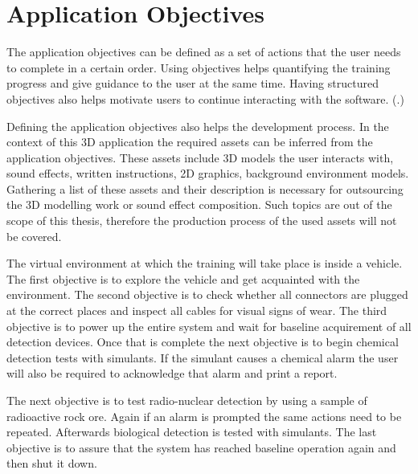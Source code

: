 \documentclass[12pt, a4paper,oneside, nocenter]{thesis}
\renewcommand{\citep}[1]{(\citealp{#1}.)}
\begin{document}
\section{Application Objectives}
The application objectives can be defined as a set of actions that the user needs to complete in a certain order. Using objectives helps quantifying the training progress and give guidance to the user at the same time. Having structured objectives also helps motivate users to continue interacting with the software. \citep{goal-oriented-games}
\par
Defining the application objectives also helps the development process. In the context of this 3D application the required assets can be inferred from the application objectives. These assets include 3D models the user interacts with, sound effects, written instructions, 2D graphics, background environment models. Gathering a list of these assets and their description is necessary for outsourcing the 3D modelling work or sound effect composition. Such topics are out of the scope of this thesis, therefore the production process of the used assets will not be covered.
\par
The virtual environment at which the training will take place is inside a vehicle. The first objective is to explore the vehicle and get acquainted with the environment. The second objective is to check whether all connectors are plugged at the correct places and inspect all cables for visual signs of wear. The third objective is to power up the entire system and wait for baseline acquirement of all detection devices. Once that is complete the next objective is to begin chemical detection tests with simulants. If the simulant causes a chemical alarm the user will also be required to acknowledge that alarm and print a report.
\par
The next objective is to test radio-nuclear detection by using a sample of radioactive rock ore. Again if an alarm is prompted the same actions need to be repeated. Afterwards biological detection is tested with simulants. The last objective is to assure that the system has reached baseline operation again and then shut it down.
\end{document}
